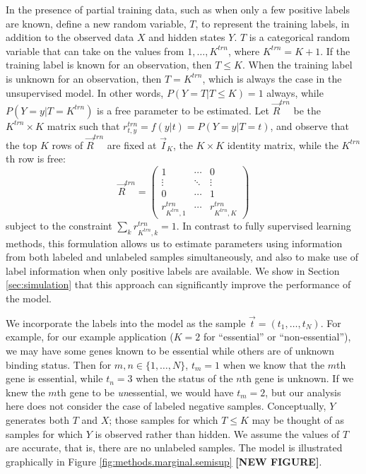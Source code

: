 \documentclass{bmcart}
\begin{document}
In the presence of partial training data, such as when only a few positive labels are known, define a new random variable, 
$T$, to represent the training labels, in addition to the observed data $X$ and hidden states $Y$.  $T$ is a 
categorical random variable that can take on the values from $1, \ldots, K^{trn}$, where $K^{trn} = K+1$. If the training 
label is known for an observation, then $T \leq K$. When the training label  is unknown for an observation, then $T = K
^{trn}$, which is always the case in the unsupervised model. In other words, $P(Y = T | T \leq K) = 1$ 
always, while $P(Y = y | T = K^{trn})$ is a free parameter to be estimated.  Let $\vec R^{trn}$ be the $K
^{trn} \times K$ matrix such that $r_{t,y}^{trn} = f(y | t) = P(Y = y | T = t)$, and observe that the top 
$K$ rows of $\vec R^{trn}$ are fixed at $\vec I_K$, the $K \times K$ identity matrix, while the $K^{trn}$th row is free:
\begin{equation}\label{eqn:Rtrain}
	\vec R^{trn} = \begin{pmatrix}
		1 & \cdots & 0 \\
		\vdots & \ddots & \vdots \\
		0 & \cdots & 1 \\
		r_{K^{trn}, 1}^{trn} & \cdots & r_{K^{trn}, K}^{trn}
	\end{pmatrix}
\end{equation}
subject to the constraint $\sum_k r_{K^{trn}, k}^{trn}= 1$.  In contrast to fully supervised learning methods, this formulation 
allows us to estimate parameters using information from both labeled and unlabeled samples simultaneously, and also to 
make use of label information when only positive labels are available.  We show in Section \ref{sec:simulation} that this 
approach can significantly improve the performance of the model.

We incorporate the labels into the model as the sample $\vec t = (t_1, \ldots, t_N)$.  For example, for our example application ($K = 2$ for ``essential'' or ``non-essential''), we may have some genes known to be essential  while others are of unknown binding status.   Then for $m,n \in \{1, \ldots, N\}$,  $t_m = 1$ when we know that the $m$th gene is essential, while $t_n = 3$ when the status of the $n$th gene is unknown.  If we knew the $m$th gene to be \textit{un}essential, we would have $t_m = 
2$, but our analysis here does not consider the case of labeled negative samples.  Conceptually, $Y$ generates both $T$ 
and $X$; those samples for which $T \leq K$ may be thought of as samples for which $Y$ is observed rather than hidden.  
We assume the values of $T$ are accurate, that is, there are no unlabeled samples.  The model is illustrated graphically in 
Figure \ref{fig:methods.marginal.semisup} \textbf{[NEW FIGURE]}.
\end{document}
